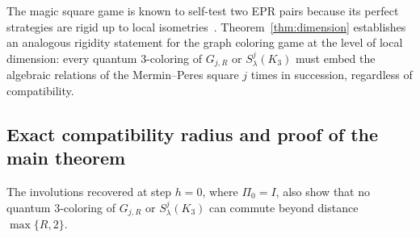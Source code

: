 The magic square game is known to self-test two EPR pairs because its perfect strategies are rigid up to local isometries~\cite{WBMS,CS}. Theorem~\ref{thm:dimension} establishes an analogous rigidity statement for the graph coloring game at the level of local dimension: every quantum $3$-coloring of $G_{j,R}$ or $S^j_\lambda(K_3)$ must embed the algebraic relations of the Mermin--Peres square $j$ times in succession, regardless of compatibility.

\subsection{Exact compatibility radius and proof of the main theorem}\label{sec:largest-radius}

The involutions recovered at step $h=0$, where $\Pi_0=I$, also show that no quantum $3$-coloring of $G_{j,R}$ or $S^j_\lambda(K_3)$ can commute beyond distance $\max\{R,2\}$.

